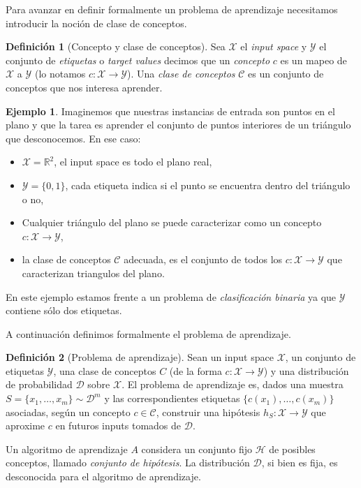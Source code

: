 \documentclass{article}
\theoremstyle{definition}
\newtheorem{definition}{Definici\'on}%
\newtheorem{example}{Ejemplo}%
\begin{document}
Para avanzar en definir formalmente un problema de aprendizaje necesitamos introducir la noci\'on de clase de conceptos.

\begin{definition}[Concepto y clase de conceptos]
    Sea $\mathcal{X}$ el \emph{input space} y $\mathcal{Y}$ el conjunto de \emph{etiquetas} o \emph{target values} decimos que un \emph{concepto} $c$ es un mapeo de $\mathcal{X}$ a $\mathcal{Y}$ (lo notamos $c : \mathcal{X} \to \mathcal{Y}$). Una \emph{clase de conceptos} $\mathcal{C}$ es un conjunto de conceptos que nos interesa aprender.
\end{definition}

\begin{example}
    
    Imaginemos que nuestras instancias de entrada son puntos en el plano y que la tarea es aprender el conjunto de puntos interiores de un tri\'angulo que desconocemos. En ese caso:
    \begin{itemize}
        \item $\mathcal{X} = \mathbb{R}^2$, el input space es todo el plano real,
        \item $\mathcal{Y} = \{0, 1\}$, cada etiqueta indica si el punto se encuentra dentro del tri\'angulo o no,
        \item Cualquier tri\'angulo del plano se puede caracterizar como un concepto $c : \mathcal{X} \to \mathcal{Y}$,
        \item la clase de conceptos $\mathcal{C}$ adecuada, es el conjunto de todos los $c : \mathcal{X} \to \mathcal{Y}$ que caracterizan triangulos del plano.
    \end{itemize}
    En este ejemplo estamos frente a un problema de \emph{clasificaci\'on binaria} ya que $\mathcal{Y}$ contiene s\'olo dos etiquetas.

\end{example}

A continuaci\'on definimos formalmente el problema de aprendizaje.

\begin{definition}[Problema de aprendizaje]
    Sean un input space $\mathcal{X}$, un conjunto de etiquetas $\mathcal{Y}$, una clase de conceptos $C$ (de la forma $c : \mathcal{X} \to \mathcal{Y}$) y una distribuci\'on de probabilidad $\mathcal{D}$ sobre $\mathcal{X}$. El problema de aprendizaje es, dados una muestra $S = \{x_1, \dots, x_m\} \sim \mathcal{D}^m$ y las correspondientes etiquetas $\{c(x_1), \dots, c(x_m)\}$ asociadas, seg\'un un concepto $c \in \mathcal{C}$, construir una hip\'otesis $h_{S} : \mathcal{X} \to \mathcal{Y}$ que aproxime $c$ en futuros inputs tomados de $\mathcal{D}$.
    
    Un algoritmo de aprendizaje $A$ considera un conjunto fijo $\mathcal{H}$ de posibles conceptos, llamado \emph{conjunto de hip\'otesis}. La distribuci\'on $\mathcal{D}$, si bien es fija, es desconocida para el algoritmo de aprendizaje.
\end{definition}
\end{document}
